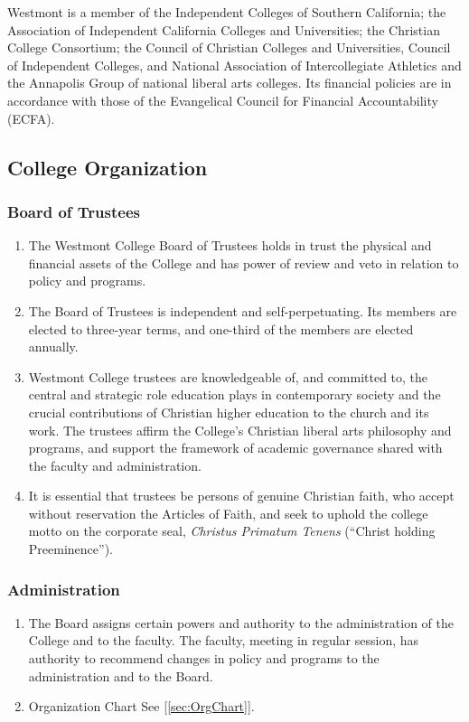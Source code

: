 			Westmont is a member of the Independent Colleges of Southern California; the Association of Independent
			California Colleges and Universities; the Christian College Consortium; the Council of Christian Colleges
			and Universities, Council of Independent Colleges, and National Association of Intercollegiate Athletics and
			the Annapolis Group of national liberal arts colleges.  Its financial policies are in accordance with those
			of the Evangelical Council for Financial Accountability (ECFA).

	\subsection{College Organization}
		\label{sec:CollegeOrganization}
		\subsubsection{Board of Trustees}
			\begin{enumerate}
				\item{
					The Westmont College Board of Trustees holds in trust the physical and financial assets of the College and has power of review and veto in relation to policy and
					programs.
				}
				\item{
					The Board of Trustees is independent and self-perpetuating. Its members are
					elected to three-year terms, and one-third of the members are elected annually.
				}
				\item{
					Westmont College trustees are knowledgeable of, and committed to, the central and strategic role education plays in contemporary society and the crucial contributions of Christian higher education to the church and its work.  The trustees affirm the College's Christian liberal arts philosophy and programs, and support the framework of academic governance shared with the faculty and administration.
				}
				\item{

					It is essential that trustees be persons of genuine Christian faith, who accept without reservation
					the Articles of Faith, and seek to uphold the college motto on the corporate seal, \emph{Christus Primatum
						Tenens} (``Christ holding Preeminence'').
				}

			\end{enumerate}
		\subsubsection{Administration}
			\begin{enumerate}
				\item{The Board assigns certain powers and authority to the administration of the College and to the faculty. The faculty, meeting in regular session, has authority to recommend changes in policy and programs to the administration and to the Board.}
				\item{Organization Chart See [\autoref{sec:OrgChart}].}
			\end{enumerate}

